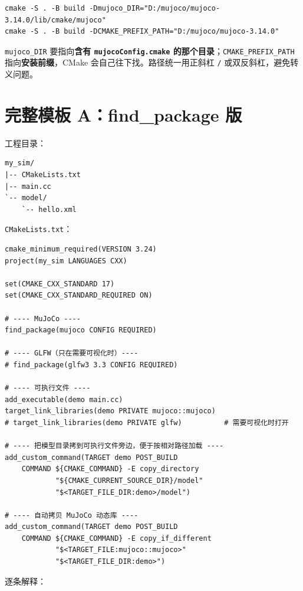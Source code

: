 \begin{lstlisting}[style=shell]
cmake -S . -B build -Dmujoco_DIR="D:/mujoco/mujoco-3.14.0/lib/cmake/mujoco"
cmake -S . -B build -DCMAKE_PREFIX_PATH="D:/mujoco/mujoco-3.14.0"
\end{lstlisting}

\texttt{mujoco\_DIR} 要指向\textbf{含有 \texttt{mujocoConfig.cmake} 的那个目录}；\texttt{CMAKE\_PREFIX\_PATH} 指向\textbf{安装前缀}，CMake 会自己往下找。路径统一用正斜杠 \texttt{/} 或双反斜杠，避免转义问题。

\section{完整模板 A：find\_package 版}

工程目录：

\begin{lstlisting}[style=code]
my_sim/
|-- CMakeLists.txt
|-- main.cc
`-- model/
    `-- hello.xml
\end{lstlisting}

\texttt{CMakeLists.txt}：

\begin{lstlisting}[style=cmake]
cmake_minimum_required(VERSION 3.24)
project(my_sim LANGUAGES CXX)

set(CMAKE_CXX_STANDARD 17)
set(CMAKE_CXX_STANDARD_REQUIRED ON)

# ---- MuJoCo ----
find_package(mujoco CONFIG REQUIRED)

# ---- GLFW（只在需要可视化时）----
# find_package(glfw3 3.3 CONFIG REQUIRED)

# ---- 可执行文件 ----
add_executable(demo main.cc)
target_link_libraries(demo PRIVATE mujoco::mujoco)
# target_link_libraries(demo PRIVATE glfw)          # 需要可视化时打开

# ---- 把模型目录拷到可执行文件旁边，便于按相对路径加载 ----
add_custom_command(TARGET demo POST_BUILD
    COMMAND ${CMAKE_COMMAND} -E copy_directory
            "${CMAKE_CURRENT_SOURCE_DIR}/model"
            "$<TARGET_FILE_DIR:demo>/model")

# ---- 自动拷贝 MuJoCo 动态库 ----
add_custom_command(TARGET demo POST_BUILD
    COMMAND ${CMAKE_COMMAND} -E copy_if_different
            "$<TARGET_FILE:mujoco::mujoco>"
            "$<TARGET_FILE_DIR:demo>")
\end{lstlisting}

逐条解释：

